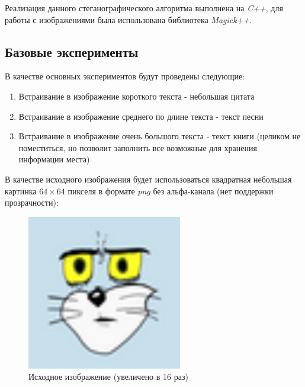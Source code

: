 \documentclass[a4paper]{article}
\begin{document}
  Реализация данного стеганографического алгоритма выполнена на \textit{C++},
  для работы с изображениями была использована библиотека \textit{Magick++}.

  \subsection{Базовые эксперименты}

  В качестве основных экспериментов будут проведены следующие:
  \begin{enumerate}
    \item Встраивание в изображение короткого текста - небольшая цитата
    \item Встраивание в изображение среднего по длине текста - текст песни
    \item Встраивание в изображение очень большого текста - текст книги (целиком не поместиться, но позволит заполнить все возможные для хранения информации места)
  \end{enumerate}

  В качестве исходного изображения будет использоваться квадратная небольшая картинка $64\times{64}$ пикселя
  в формате \textit{png} без альфа-канала (нет поддержки прозрачности):
  \begin{figure}[H]
    \centering
    \includegraphics[width=256px]{cat_base}
    \caption{Исходное изображение (увеличено в 16 раз)}
  \end{figure}
\end{document}
